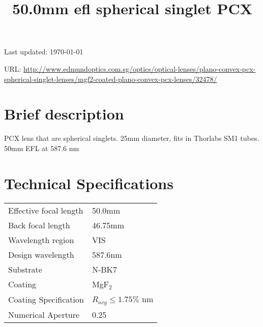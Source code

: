 \documentclass{article}
\title{\vspace{-4cm}50.0mm efl spherical singlet PCX}
\date{}
\begin{document}
\maketitle

\vspace{-1cm}

Last updated: \today

URL: \url{http://www.edmundoptics.com.sg/optics/optical-lenses/plano-convex-pcx-spherical-singlet-lenses/mgf2-coated-plano-convex-pcx-lenses/32478/}

\begin{multicols}{2}

\section{Brief description}

PCX lens that are spherical singlets. 25mm diameter, fits in Thorlabs SM1 tubes. 50mm EFL at 587.6 nm



\section{Technical Specifications}


\begin{tabular}{|l|l|}
  Effective focal length & 50.0mm \\
  Back focal length & 46.75mm\\
  Wavelength region & VIS \\
  Design wavelength & 587.6nm \\
  Substrate & N-BK7 \\
  Coating & MgF$_{2}$ \\
  Coating Specification & $R_{avg} \leq 1.75\%$ nm \\
  Numerical Aperture & 0.25 \\
\end{tabular}%


\end{multicols}
\end{document}
